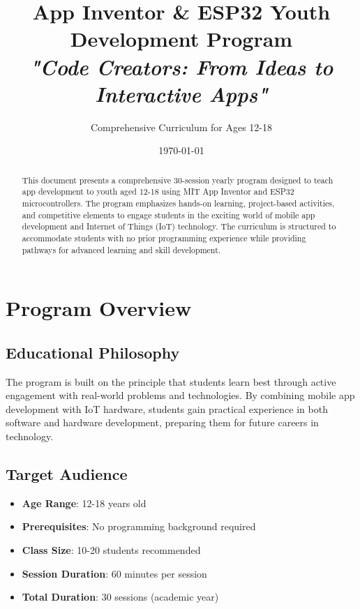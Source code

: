\documentclass[12pt,a4paper]{article}
\begin{document}
\title{\Huge\textbf{App Inventor \& ESP32 Youth Development Program}\\
\Large\textit{"Code Creators: From Ideas to Interactive Apps"}}
\author{Comprehensive Curriculum for Ages 12-18}
\date{\today}

\maketitle

\begin{abstract}
This document presents a comprehensive 30-session yearly program designed to teach app development to youth aged 12-18 using MIT App Inventor and ESP32 microcontrollers. The program emphasizes hands-on learning, project-based activities, and competitive elements to engage students in the exciting world of mobile app development and Internet of Things (IoT) technology. The curriculum is structured to accommodate students with no prior programming experience while providing pathways for advanced learning and skill development.
\end{abstract}

\tableofcontents
\newpage

\section{Program Overview}

\subsection{Educational Philosophy}
The program is built on the principle that students learn best through active engagement with real-world problems and technologies. By combining mobile app development with IoT hardware, students gain practical experience in both software and hardware development, preparing them for future careers in technology.

\subsection{Target Audience}
\begin{itemize}
    \item \textbf{Age Range}: 12-18 years old
    \item \textbf{Prerequisites}: No programming background required
    \item \textbf{Class Size}: 10-20 students recommended
    \item \textbf{Session Duration}: 60 minutes per session
    \item \textbf{Total Duration}: 30 sessions (academic year)
\end{itemize}
\end{document}
